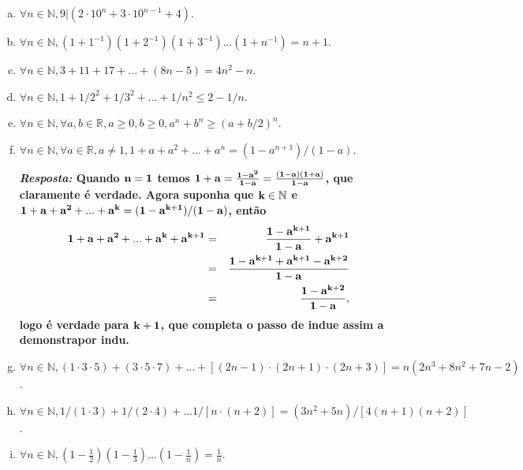 \begin{enumerate}[{\bf 1.}]
\begin{enumerate}[a)]
{\bf{\it Resposta:} Quando ${\bf n=1}$ temos ${\bf 1^1\geq 1!}$ que \'e verdade. Agora suponha ${\bf k\in\mathbb{N}}$ e ${\bf k^k\geq k!}$. Assim, ${\bf  (k+1)^{k+1}=(k+1)^{k}(k+1)\geq k^k(k+1)\geq k!(k+1)=(k+1)!},$ logo \'e verdade para ${\bf k+1}$, que completa o passo de indu\cao e assim a demonstra\cao por indu\caoi.}

\item $\forall n\in\mathbb{N}, 9|(2\cdot 10^n+3\cdot 10^{n-1}+4)$.
\item $\forall n\in\mathbb{N}, (1+1^{-1})(1+2^{-1})(1+3^{-1})...(1+n^{-1})=n+1$.
\item $\forall n\in\mathbb{N}, 3+11+17+...+(8n-5)=4n^2-n$.
\item $\forall n\in\mathbb{N}, 1+1/2^2+1/3^2+...+1/n^2\leq 2-1/n$.
\item $\forall n\in\mathbb{N}, \forall a,b\in\mathbb{R}, a\geq 0, b\geq 0, a^n+b^n\geq(a+b/2)^n$.
\item $\forall n\in\mathbb{N}, \forall a\in\mathbb{R}, a\neq 1, 1+a+a^2+...+a^n=(1-a^{n+1})/(1-a)$.

{\bf{\it Resposta:} Quando ${\bf n=1}$ temos ${\bf 1+a=\frac{1-a^2}{1-a}=\frac{(1-a)(1+a)}{1-a}}$, que claramente é verdade. Agora suponha que ${\bf k\in\mathbb{N}}$ e ${\bf 1+a+a^2+...+a^k=(1-a^{k+1})/(1-a)}$, então
\begin{eqnarray*}
{\bf 1+a+a^2+...+a^k+a^{k+1}}&=&{\bf  \frac{1-a^{k+1}}{1-a}+a^{k+1}}\\
                          &=&{\bf  \frac{1-a^{k+1}+a^{k+1}-a^{k+2}}{1-a}}\\
                          &=&{\bf  \frac{1-a^{k+2}}{1-a}},
\end{eqnarray*}  
logo \'e verdade para ${\bf k+1}$, que completa o passo de indu\cao e assim a demonstra\cao por indu\caoi.}

\item $\forall n\in\mathbb{N}, (1\cdot 3\cdot 5)+(3\cdot 5\cdot 7)+...+[(2n-1)\cdot (2n+1)\cdot (2n+3)]=n(2n^3+8n^2+7n-2)$.
\item $\forall n\in\mathbb{N}, 1/(1\cdot 3)+1/(2\cdot 4)+...1/[n\cdot(n+2)]=(3n^2+5n)/[4(n+1)(n+2)]$.
\item $\forall n\in\mathbb{N}, (1-\frac{1}{2})(1-\frac{1}{3})...(1-\frac{1}{n})=\frac{1}{n}$.


\end{enumerate}
\end{enumerate}
